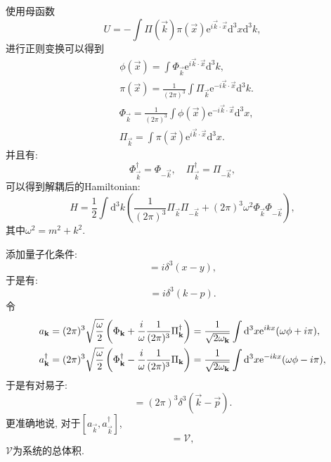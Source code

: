 使用母函数
\begin{equation}
    U=-\int\Pi(\vec k)\pi(\vec x)\mathrm e^{i\vec k\cdot\vec x}\mathrm d^3x\mathrm d^3k,
\end{equation}
进行正则变换可以得到
\begin{align}
    &\phi(\vec x)=\int\Phi_{\vec k}\mathrm e^{i\vec k\cdot\vec x}\mathrm d^3k,\\
    &\pi(\vec x)=\frac1{(2\pi)^3}\int\Pi_{\vec k}\mathrm e^{-i\vec k\cdot\vec x}\mathrm d^3k.
\end{align}
\begin{align}
    &\Phi_{\vec k}=\frac1{(2\pi)^3}\int\phi(\vec x)\mathrm e^{-i\vec k\cdot\vec x}\mathrm d^3x,\\
    &\Pi_{\vec k}=\int\pi(\vec x)\mathrm e^{i\vec k\cdot\vec x}\mathrm d^3x.
\end{align}
并且有:
\begin{equation}
    \Phi_{\vec k}^\dagger=\Phi_{-\vec k}, \quad \Pi_{\vec k}^\dagger=\Pi_{-\vec k},
\end{equation}
可以得到解耦后的Hamiltonian:
\begin{equation}
    H=\frac12\int \mathrm d^3k (\frac1{(2\pi)^3}\Pi_{\vec k}\Pi_{-\vec k}+(2\pi)^3\omega^2\Phi_{\vec k}\Phi_{-\vec k}),
\end{equation}
其中$\omega^2=m^2+k^2$.

添加量子化条件:
\begin{equation}
    [\phi(\vec x, t),\pi(\vec y, t)]=i\delta^3(x-y),
\end{equation}
于是有:
\begin{equation}
    [\Phi_{\vec k}, \Pi_{\vec p}]=i\delta^3(k-p).
\end{equation}
令
\begin{align}
    &a_{\mathbf{k}}=(2\pi)^3\sqrt{\frac{\omega}{2}}\left(\Phi_{\mathbf{k}}+\frac i{\omega}\frac1{(2\pi)^3}\Pi_{\mathbf{k}}^\dagger\right)=\frac1{\sqrt{2\omega_{\mathbf{k}}}}\int\mathrm d^3x\mathrm e^{ikx}(\omega\phi+i\pi),\\
    &a^\dagger_{\mathbf{k}}=(2\pi)^3\sqrt{\frac{\omega}{2}}\left(\Phi_{\mathbf{k}}^\dagger-\frac i{\omega}\frac1{(2\pi)^3}\Pi_{\mathbf{k}}\right)=\frac1{\sqrt{2\omega_{\mathbf{k}}}}\int\mathrm d^3x\mathrm e^{-ikx}(\omega\phi-i\pi),
\end{align}
于是有对易子:
\begin{equation}
    [a_{\vec k}, a_{\vec p}^\dagger]=(2\pi)^3\delta^3(\vec k-\vec p).
\end{equation}
更准确地说, 对于$[a_{\vec k}, a_{\vec k}^\dagger]$, 
\begin{equation}
    [a_{\vec k}, a_{\vec k}^\dagger]=\mathcal V, 
\end{equation}
$\mathcal V$为系统的总体积.

